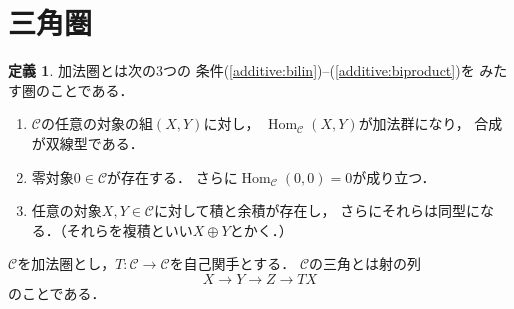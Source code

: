 \documentclass[leqno, 10pt, a4paper, dvipdfmx]{jsarticle}
\theoremstyle{definition}
\newcommand{\Hom}{\mathop{\mathrm{Hom}}\nolimits} %
\numberwithin{equation}{section}
\newcommand{\cat}{\mathscr{C}}
\theoremstyle{mystyle}
\newtheorem{DFN}[AXM]{定義}
\begin{document}
\section{三角圏}\label{ssec:tricat}

\begin{DFN}
    加法圏とは次の3つの
    条件(\ref{additive:bilin})--(\ref{additive:biproduct})を
    みたす圏のことである．
    \begin{enumerate}[(1)]
        \item \(\cat\)の任意の対象の組\((X, Y)\)に対し，
        \(\Hom_{\cat}(X,Y)\)が加法群になり，
        合成
        が双線型である．\label{additive:bilin}
        \item 零対象$0\in\cat$が存在する．
        さらに$\Hom_{\cat}(0,0)=0$が成り立つ．\label{additive:zero}
        \item 任意の対象$X, Y\in\cat$に対して積と余積が存在し，
        さらにそれらは同型になる．（それらを複積といい$X\oplus Y$とかく．）\label{additive:biproduct}
    \end{enumerate}
\end{DFN}

$\cat$を加法圏とし，$T\colon\cat\to\cat$を自己関手とする．
$\cat$の三角とは射の列
\begin{equation*}
    X\to Y\to Z\to TX
\end{equation*}
のことである．
\end{document}
